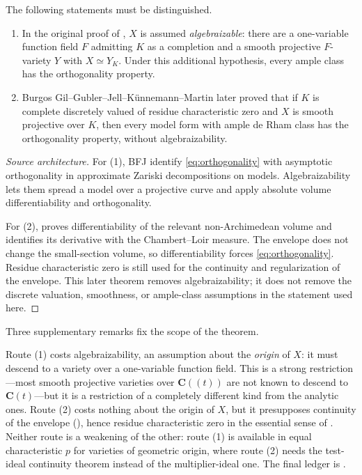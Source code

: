 \begin{theorem}\label{thm:orthogonality-provenance}
The following statements must be distinguished.
\begin{enumerate}
\item In the original proof of \cite[Theorem~A.4]{BFJ15}, \(X\) is assumed
\emph{algebraizable}: there are a one-variable function field \(F\) admitting
\(K\) as a completion and a smooth projective \(F\)-variety \(Y\) with
\(X\simeq Y_K\). Under this additional hypothesis, every ample class has the
orthogonality property.
\item Burgos Gil--Gubler--Jell--K\"unnemann--Martin later proved that if
\(K\) is complete discretely valued of residue characteristic zero and \(X\)
is smooth projective over \(K\), then every model form with ample de Rham
class has the orthogonality property, without algebraizability.
\end{enumerate}
\par
\end{theorem}

\begin{proof}[Source architecture]
For (1), BFJ identify \eqref{eq:orthogonality} with asymptotic orthogonality
in approximate Zariski decompositions on models. Algebraizability lets them
spread a model over a projective curve and apply absolute volume
differentiability and orthogonality.

For (2), \cite[Theorem~6.3.3]{BGGJKM20} proves differentiability of the
relevant non-Archimedean volume and identifies its derivative with the
Chambert--Loir measure. The envelope does not change the small-section
volume, so differentiability forces
\eqref{eq:orthogonality}. Residue characteristic zero is still used for the
continuity and regularization of the envelope. This later theorem removes
algebraizability; it does not remove the discrete valuation, smoothness, or
ample-class assumptions in the statement used here.
\end{proof}

Three supplementary remarks fix the scope of the theorem.

\begin{remark}
\label{rem:ch27-two-routes}
Route (1) costs algebraizability, an assumption about the \emph{origin} of
\(X\): it must descend to a variety over a one-variable function field.  This
is a strong restriction---most smooth projective varieties over
\(\mathbf C(\!(t)\!)\) are not known to descend to
\(\mathbf C(t)\)---but it is a restriction of a completely different kind
from the analytic ones.  Route (2) costs nothing about the origin of \(X\),
but it presupposes continuity of the envelope
(), hence residue characteristic zero in
the essential sense of .  Neither route is a
weakening of the other: route (1) is available in equal characteristic
\(p\) for varieties of geometric origin, where route (2) needs the
test-ideal continuity theorem instead of the multiplier-ideal one.  The
final ledger is .
\end{remark}

